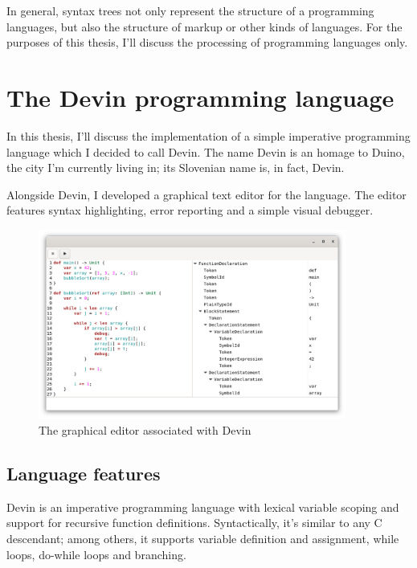 \documentclass[UdineBachThesis,american,11pt]{PhdThesis}
\begin{document}
  In general, syntax trees not only represent the structure of a programming
  languages, but also the structure of markup or other kinds of languages. For
  the purposes of this thesis, I'll discuss the processing of programming
  languages only.

  \newpage

  \thispagestyle{empty}

  \chapter{The Devin programming language}

  In this thesis, I'll discuss the implementation of a simple imperative
  programming language which I decided to call Devin. The name Devin is an
  homage to Duino, the city I'm currently living in; its Slovenian name is, in
  fact, Devin.

  Alongside Devin, I developed a graphical text editor for the language. The
  editor features syntax highlighting, error reporting and a simple visual
  debugger.

  \begin{figure}[h]
    \centering
    \includegraphics[width=0.9\textwidth]{2.png}
    \caption{The graphical editor associated with Devin}
  \end{figure}

  \section{Language features}

  Devin is an imperative programming language with lexical variable scoping and
  support for recursive function definitions. Syntactically, it's similar to any
  C descendant; among others, it supports variable definition and assignment,
  while loops, do-while loops and branching.
\end{document}
